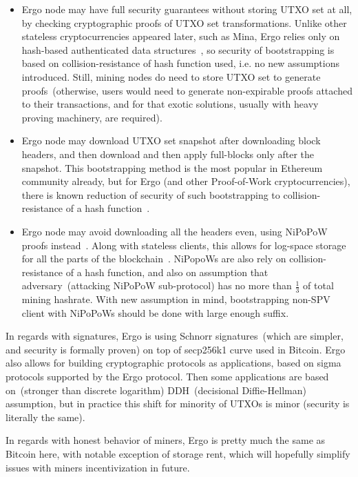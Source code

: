 \documentclass{article}   %
\begin{document}
\begin{itemize}
  \item{} Ergo node may have full security guarantees without storing UTXO set at all, by checking cryptographic proofs of UTXO set transformations. Unlike other stateless cryptocurrencies appeared later, such as Mina, Ergo relies only on hash-based authenticated data structures~\cite{reyzin2017improving}, so security of bootstrapping is based on collision-resistance of hash function used, i.e. no new assumptions introduced. Still, mining nodes do need to store UTXO set to generate proofs~(otherwise, users would need to generate non-expirable proofs attached to their transactions, and for that exotic solutions, usually with heavy proving machinery, are required).
  \item{} Ergo node may download UTXO set snapshot after downloading block headers, and then download and then apply full-blocks only after the snapshot. This bootstrapping method is the most popular in Ethereum community already, but for Ergo (and other Proof-of-Work cryptocurrencies), there is known reduction of security of such bootstrapping to collision-resistance of a hash function~\cite{duong2018multi}. 
  \item{} Ergo node may avoid downloading all the headers even, using NiPoPoW proofs instead~\cite{kiayias2020non}. Along with stateless clients, this allows for log-space storage for all the parts of the blockchain~\cite{kiayias2021mining}. NiPopoWs are also rely on collision-resistance of a hash function, and also on assumption that adversary~(attacking NiPoPoW sub-protocol) has no more than $\frac{1}{3}$ of total mining hashrate. With new assumption in mind, bootstrapping non-SPV client with NiPoPoWs should be done with large enough suffix.  
\end{itemize} 

In regards with signatures, Ergo is using Schnorr signatures~(which are simpler, and security is formally proven) on top of secp256k1 curve used in Bitcoin. Ergo also allows for building cryptographic protocols as applications, based on sigma protocols supported by the Ergo protocol. Then some applications are based on~(stronger than discrete logarithm) DDH~(decisional Diffie-Hellman) assumption, but in practice this shift for minority of UTXOs is minor (security is literally the same).


In regards with honest behavior of miners, Ergo is pretty much the same as Bitcoin here, with notable exception of storage rent, which will hopefully simplify issues with miners incentivization in future. 
\end{document}
